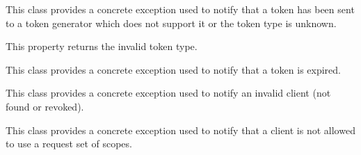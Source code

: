 \documentclass[letterpaper,10pt,english]{sphinxmanual}
\begin{document}
\begin{fulllineitems}
\label{features/oauth2/technical_summary:fantastico.oauth2.exceptions.OAuth2InvalidTokenTypeError}
This class provides a concrete exception used to notify that a token has been sent to a token generator which does not
support it or the token type is unknown.

\begin{fulllineitems}
\label{features/oauth2/technical_summary:fantastico.oauth2.exceptions.OAuth2InvalidTokenTypeError.token_type}
This property returns the invalid token type.

\end{fulllineitems}


\end{fulllineitems}


\begin{fulllineitems}
\label{features/oauth2/technical_summary:fantastico.oauth2.exceptions.OAuth2TokenExpiredError}
This class provides a concrete exception used to notify that a token is expired.

\end{fulllineitems}


\begin{fulllineitems}
\label{features/oauth2/technical_summary:fantastico.oauth2.exceptions.OAuth2InvalidClientError}
This class provides a concrete exception used to notify an invalid client (not found or revoked).

\end{fulllineitems}


\begin{fulllineitems}
\label{features/oauth2/technical_summary:fantastico.oauth2.exceptions.OAuth2InvalidScopesError}
This class provides a concrete exception used to notify that a client is not allowed to use a request set of scopes.

\end{fulllineitems}
\end{document}
